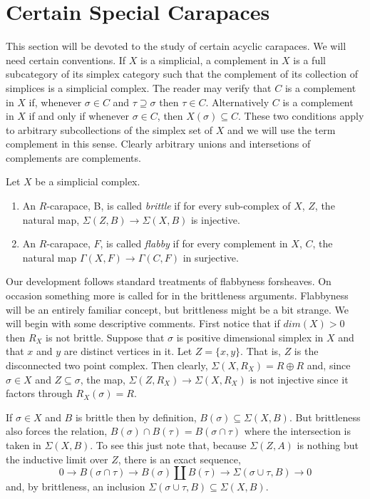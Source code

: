 \section{Certain Special Carapaces}\label{art6-sec-6}
This section will be devoted to the study of certain acyclic carapaces. We will need certain conventions. If $X$ is a simplicial, a complement in $X$ is a full subcategory of its simplex category such that the complement of its collection of simplices is a simplicial complex.  The reader may verify that $C$ is a complement in $X$ if, whenever $\sigma \in C$ and $\tau \supseteq \sigma$ then $\tau \in C$. Alternatively $C$ is a complement in $X$ if and only if whenever $\sigma \in C$, then $X (\sigma) \subseteq C$. These two conditions apply to arbitrary subcollections of the simplex set of $X$ and we will use the term complement in this sense. Clearly arbitrary unions and intersetions of complements are complements.

\begin{definition}\label{art6-definition-6.1}
Let $X$ be a simplicial complex.
    \begin{enumerate}[(1)]
    \item An $R$-carapace, B, is called \textit{brittle} if for every sub-complex of $X$, $Z$, the natural map, $\Sigma(Z, B) \rightarrow \Sigma(X, B)$ is injective.\label{art6-definition6.1-1}
    \item An $R$-carapace, $F$, is called \textit{flabby} if for every complement in $X$, $C$, the natural map $\Gamma(X, F) \rightarrow \Gamma (C, F)$ in surjective.\label{art6-definition6.1-2}
    \end{enumerate}
\end{definition}

Our development follows standard treatments of flabbyness for\break sheaves. On occasion something more is called for in the brittleness arguments. Flabbyness will be an entirely familiar concept, but brittleness might be a bit strange. We will begin with some descriptive comments. First notice that if $dim(X)>0$ then $R_{X}$ is not brittle. Suppose that $\sigma$ is positive dimensional simplex in $X$ and that $x$ and $y$ are distinct vertices in it. Let $Z=\{x, y\}$. That is, $Z$ is the disconnected two point complex. Then clearly, $\Sigma(X, R_{X})= R\oplus R$ and, since $\sigma \in X$ and $Z \subseteq \sigma$, the map, $\Sigma(Z, R_{X})\rightarrow \Sigma(X, R_{X})$ is not injective since it factors through $R_{X}(\sigma) = R$. 

If $\sigma \in X$ and $B$ is brittle then by definition, $B(\sigma) \subseteq \Sigma(X, B)$. But brittleness also forces the relation, $B(\sigma)\cap B(\tau) = B(\sigma \cap \tau)$ where the intersection is taken in $\Sigma(X, B)$. To see this just note that, because $\Sigma(Z, A)$ is nothing  but the inductive limit over $Z$, there is an exact sequence,
$$
0 \rightarrow B(\sigma \cap \tau) \rightarrow B(\sigma) \coprod B(\tau) \rightarrow \Sigma(\sigma \cup \tau, B)\rightarrow 0
$$
and, by brittleness, an inclusion $\Sigma(\sigma \cup \tau, B) \subseteq \Sigma(X, B)$.

